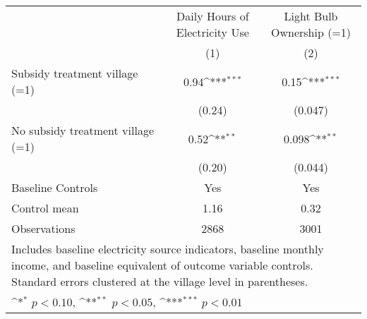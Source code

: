 \def\sym#1{\ifmmode^{#1}\else\(^{#1}\)\fi}
\begin{adjustbox}{max
width={.97\textwidth},caption={Endline electricity and bulb outcomes},nofloat=table}
\begin{tabular}{l*{2}{c}}
\toprule
& \shortstack{Daily Hours of\\Electricity Use} & \shortstack{Light Bulb\\Ownership (=1)} \\
& (1) & (2) \\ \hline
Subsidy treatment village (=1)&     0.94\sym{***}&     0.15\sym{***}\\
                &   (0.24)         &  (0.047)         \\
No subsidy treatment village (=1)&     0.52\sym{**} &    0.098\sym{**} \\
                &   (0.20)         &  (0.044)         \\
                \addlinespace
Baseline Controls &      Yes         &      Yes         \\

Control mean           &     1.16         &     0.32         \\
Observations    &     2868         &     3001         \\
\bottomrule
\multicolumn{3}{p{\textwidth}}{\footnotesize Includes baseline electricity source indicators, baseline monthly income, and baseline equivalent of outcome variable controls. Standard errors clustered at the village level in parentheses.}\\
\multicolumn{3}{p{\textwidth}}{\footnotesize \sym{*} \(p<0.10\), \sym{**} \(p<0.05\), \sym{***} \(p<0.01\)}\\
\end{tabular}\end{adjustbox}
